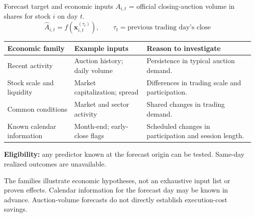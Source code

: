\documentclass[aspectratio=169,11pt]{beamer}
\newcommand{\source}[1]{\par\vfill{\fontsize{7.5}{9}\selectfont\color{Muted}#1\par}}
\begin{document}
\begin{frame}{Forecast target and economic inputs}
$A_{i,t}$ = official closing-auction volume in shares for stock $i$ on day $t$.
\[
 \widehat A_{i,t}=f\!\left(\mathbf x_{i,t}^{(\tau_t)}\right),
 \qquad \tau_t=\text{previous trading day's close}
\]
\small
\begin{tabularx}{\textwidth}{@{}L{3.1cm}L{4.0cm}Y@{}}
\toprule
\textbf{Economic family} & \textbf{Example inputs} & \textbf{Reason to investigate}\\
\midrule
Recent activity & Auction history; daily volume & Persistence in typical auction demand.\\[0.6em]
Stock scale and liquidity & Market capitalization; spread & Differences in trading scale and participation.\\[0.6em]
Common conditions & Market and sector activity & Shared changes in trading demand.\\[0.6em]
Known calendar information & Month-end; early-close flags & Scheduled changes in participation and session length.\\
\bottomrule
\end{tabularx}
\par\medskip
\textbf{Eligibility:} any predictor known at the forecast origin can be tested. Same-day realized outcomes are unavailable.
\source{The families illustrate economic hypotheses, not an exhaustive input list or proven effects. Calendar information for the forecast day may be known in advance. Auction-volume forecasts do not directly establish execution-cost savings.}
\end{frame}
\end{document}
